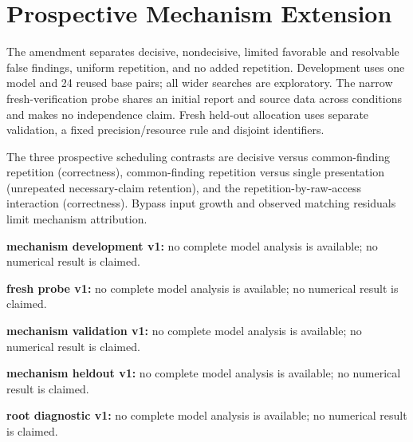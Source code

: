 \section{Prospective Mechanism Extension}
The amendment separates decisive, nondecisive, limited favorable and resolvable false findings, uniform repetition, and no added repetition. Development uses one model and 24 reused base pairs; all wider searches are exploratory. The narrow fresh-verification probe shares an initial report and source data across conditions and makes no independence claim. Fresh held-out allocation uses separate validation, a fixed precision/resource rule and disjoint identifiers.\par
The three prospective scheduling contrasts are decisive versus common-finding repetition (correctness), common-finding repetition versus single presentation (unrepeated necessary-claim retention), and the repetition-by-raw-access interaction (correctness). Bypass input growth and observed matching residuals limit mechanism attribution.\par
\textbf{mechanism development v1:} no complete model analysis is available; no numerical result is claimed.\par
\textbf{fresh probe v1:} no complete model analysis is available; no numerical result is claimed.\par
\textbf{mechanism validation v1:} no complete model analysis is available; no numerical result is claimed.\par
\textbf{mechanism heldout v1:} no complete model analysis is available; no numerical result is claimed.\par
\textbf{root diagnostic v1:} no complete model analysis is available; no numerical result is claimed.\par
